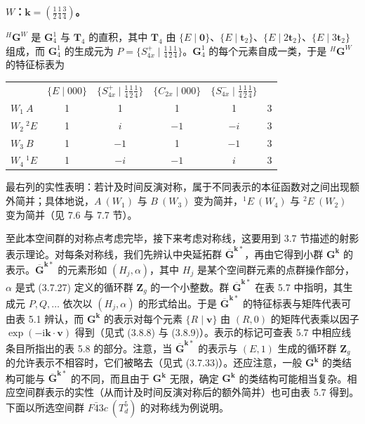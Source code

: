 \noindent\textbf{$W$：$\mathbf{k} = (\frac{1}{2}\frac{1}{4}\frac{3}{4})$。}

${}^{H}\mathbf{G}^{W}$ 是 $\mathbf{G}^{1}_{4}$ 与 $\mathbf{T}_{4}$ 的直积，其中 $\mathbf{T}_{4}$ 由 $\{E \mid \mathbf{0}\}$、$\{E \mid \mathbf{t}_{2}\}$、$\{E \mid 2\mathbf{t}_{2}\}$、$\{E \mid 3\mathbf{t}_{2}\}$ 组成，而 $\mathbf{G}^{1}_{4}$ 的生成元为 $P = \{S^{+}_{4x} \mid {\frac{1}{4}}{\frac{1}{2}}{\frac{1}{4}}\}$。$\mathbf{G}^{1}_{4}$ 的每个元素自成一类，于是 ${}^{H}\mathbf{G}^{W}$ 的特征标表为
\begin{center}
\begin{tabular}{lccccc}
 & $\{E \mid 000\}$ & $\{S^{+}_{4x} \mid {\frac{1}{4}}{\frac{1}{2}}{\frac{1}{4}}\}$ & $\{C_{2x} \mid 000\}$ & $\{S^{-}_{4x} \mid {\frac{1}{4}}{\frac{1}{2}}{\frac{1}{4}}\}$ & \\
$W_{1}\ A$ & 1 & 1 & 1 & 1 & 3\\
$W_{2}\ {}^{2}E$ & 1 & $i$ & $-1$ & $-i$ & 3\\
$W_{3}\ B$ & 1 & $-1$ & 1 & $-1$ & 3\\
$W_{4}\ {}^{1}E$ & 1 & $-i$ & $-1$ & $i$ & 3
\end{tabular}
\end{center}
最右列的实性表明：若计及时间反演对称，属于不同表示的本征函数对之间出现额外简并；具体地说，$A\ (W_{1})$ 与 $B\ (W_{3})$ 变为简并，${}^{1}E\ (W_{4})$ 与 ${}^{2}E\ (W_{2})$ 变为简并（见 7.6 与 7.7 节）。

至此本空间群的对称点考虑完毕，接下来考虑对称线，这要用到 3.7 节描述的射影表示理论。对每条对称线，我们先辨认中央延拓群 $\overline{\mathbf{G}}^{\mathbf{k}*}$，再由它得到小群 $\mathbf{G}^{\mathbf{k}}$ 的表示。$\overline{\mathbf{G}}^{\mathbf{k}*}$ 的元素形如 $(H_{j}, \alpha)$，其中 $H_{j}$ 是某个空间群元素的点群操作部分，$\alpha$ 是式 (3.7.27) 定义的循环群 $\mathbf{Z}_{g}$ 的一个小整数。群 $\overline{\mathbf{G}}^{\mathbf{k}*}$ 在表 5.7 中指明，其生成元 $P, Q, \dots$ 依次以 $(H_{j}, \alpha)$ 的形式给出。于是 $\overline{\mathbf{G}}^{\mathbf{k}*}$ 的特征标表与矩阵代表可由表 5.1 辨认，而 $\mathbf{G}^{\mathbf{k}}$ 的表示对每个元素 $\{R \mid \mathbf{v}\}$ 由 $(R, 0)$ 的矩阵代表乘以因子 $\exp(-\mathrm{i}\mathbf{k} \cdot \mathbf{v})$ 得到（见式 (3.8.8) 与 (3.8.9)）。表示的标记可查表 5.7 中相应线条目所指出的表 5.8 的部分。注意，当 $\overline{\mathbf{G}}^{\mathbf{k}*}$ 的表示与 $(E, 1)$ 生成的循环群 $\mathbf{Z}_{g}$ 的允许表示不相容时，它们被略去（见式 (3.7.33)）。还应注意，一般 $\mathbf{G}^{\mathbf{k}}$ 的类结构可能与 $\overline{\mathbf{G}}^{\mathbf{k}*}$ 的不同，而且由于 $\mathbf{G}^{\mathbf{k}}$ 无限，确定 $\mathbf{G}^{\mathbf{k}}$ 的类结构可能相当复杂。相应空间群表示的实性（从而计及时间反演对称后的额外简并）也可由表 5.7 得到。下面以所选空间群 $F\bar{4}3c\ (T^{5}_{d})$ 的对称线为例说明。

